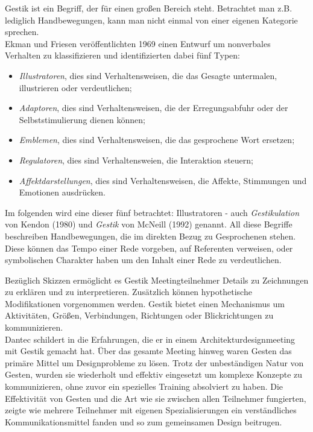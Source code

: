 \medskip Gestik ist ein Begriff, der für einen großen Bereich steht. Betrachtet man z.B. lediglich Handbewegungen, kann man nicht einmal von einer eigenen Kategorie sprechen. \citep{Goldin:2003} \\ Ekman und Friesen veröffentlichten 1969 einen Entwurf um nonverbales Verhalten zu klassifizieren und identifizierten dabei fünf Typen:
\begin{itemize}
	\item \emph{Illustratoren}, dies sind Verhaltensweisen, die das Gesagte untermalen, illustrieren oder verdeutlichen;
	\item \emph{Adaptoren}, dies sind Verhaltensweisen, die der Erregungsabfuhr oder der Selbststimulierung dienen können;
	\item \emph{Emblemen}, dies sind Verhaltensweisen, die das gesprochene Wort ersetzen;
	\item \emph{Regulatoren}, dies sind Verhaltensweien, die Interaktion steuern;
	\item \emph{Affektdarstellungen}, dies sind Verhaltensweisen, die Affekte, Stimmungen und Emotionen ausdrücken.
\end{itemize} \begin{flushright} \citep{Schaefer:2003} \end{flushright}

Im folgenden wird eine dieser fünf betrachtet: Illustratoren - auch \emph{Gestikulation} von Kendon (1980) und \emph{Gestik} von McNeill (1992) genannt. All diese Begriffe beschreiben Handbewegungen, die im direkten Bezug zu Gesprochenen stehen. Diese können das Tempo einer Rede vorgeben, auf Referenten verweisen, oder symbolischen Charakter haben um den Inhalt einer Rede zu verdeutlichen. \citep{Goldin:2003}

\medskip Bezüglich Skizzen ermöglicht es Gestik Meetingteilnehmer Details zu Zeichnungen zu erklären und zu interpretieren. Zusätzlich können hypothetische Modifikationen vorgenommen werden. Gestik bietet einen Mechanismus um Aktivitäten, Größen, Verbindungen, Richtungen oder Blickrichtungen zu kommunizieren. 
\\ Dantec schildert in \citep{Dantec:2009} die Erfahrungen, die er in einem Architekturdesignmeeting mit Gestik gemacht hat.  Über das gesamte Meeting hinweg waren Gesten das primäre Mittel um Designprobleme zu lösen. Trotz der unbeständigen Natur von Gesten, wurden sie wiederholt und effektiv eingesetzt um komplexe Konzepte zu kommunizieren, ohne zuvor ein spezielles Training absolviert zu haben. Die Effektivität von Gesten und die Art wie sie zwischen allen Teilnehmer fungierten, zeigte wie mehrere Teilnehmer mit eigenen Spezialisierungen ein verständliches Kommunikationsmittel fanden und so zum gemeinsamen Design beitrugen.

